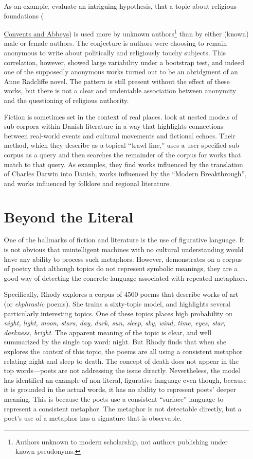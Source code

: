 As an example, \citet{jockers-13b} evaluate an intriguing hypothesis, that a topic about religious foundations ({\underline{Convents and Abbeys}) is used more by unknown authors\footnote{Authors unknown to modern scholarship, not authors publishing under known pseudonyms.} than by either (known) male or female authors.
The conjecture is authors were choosing to remain anonymous to write about politically and religiously touchy subjects.
This correlation, however, showed large variability under a bootstrap test, and indeed one of the supposedly anonymous works turned out to be an abridgment of an Anne Radcliffe novel.
The pattern is still present without the effect of these works, but there is not a clear and undeniable association between anonymity and the questioning of religious authority.

Fiction is sometimes set in the context of real places.
\citet{tangherlini-13} look at nested models of sub-corpora within Danish literature in a way that highlights connections between real-world events and cultural movements and fictional echoes.
Their method, which they describe as a topical ``trawl line,'' uses a user-specified sub-corpus as a query and then searches the remainder of the corpus for works that match to that query.
As examples, they find works influenced by the translation of Charles Darwin into Danish, works influenced by the ``Modern Breakthrough'', and works influenced by folklore and regional literature.


\section{Beyond the Literal}

One of the hallmarks of fiction and literature is the use of figurative language.
It is not obvious that unintelligent machines with no cultural understanding would have any ability to process such metaphors. However, \citet{rhody-12} demonstrates on a corpus of poetry that although topics do not represent symbolic meanings, they are a good way of detecting the concrete language associated with repeated metaphors.

Specifically, Rhody explores a corpus of 4500 poems that describe works of art (or {\em ekphrastic} poems).
She trains a sixty-topic model, and highlights several particularly interesting topics.
One of these topics places high probability on {\em night, light, moon, stars, day, dark, sun, sleep, sky, wind, time, eyes, star, darkness, bright}.
The apparent meaning of the topic is clear, and well summarized by the single top word: night.
But Rhody finds that when she explores the {\em context} of this topic, the poems are all using a consistent metaphor relating night and sleep to death.
The concept of death does not appear in the top words---poets are not addressing the issue directly.
Nevertheless, the model has identified an example of non-literal, figurative language even though, because it is grounded in the actual words, it has no ability to represent poets' deeper meaning.
This is because the poets use a consistent ``surface'' language to represent a consistent metaphor.
The metaphor is not detectable directly, but a poet's use of a metaphor has a signature that is observable.

}
